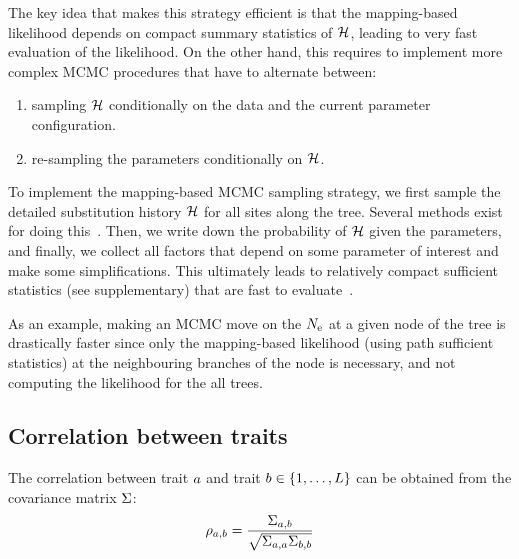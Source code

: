 \documentclass{MBE}
\begin{document}
	The key idea that makes this strategy efficient is that the mapping-based {likelihood} depends on compact summary statistics of $\mathcal{H}$, leading to very fast evaluation of the {likelihood}.
	On the other hand, this requires to implement more complex {MCMC} procedures that have to alternate between:
	\begin{enumerate}
		\item sampling $\mathcal{H}$ conditionally on the data and the current parameter configuration.
		\item re-sampling the parameters conditionally on $\mathcal{H}$.
	\end{enumerate}

	To implement the mapping-based {MCMC} sampling strategy, we first sample the detailed {substitution} history $\mathcal{H}$ for all sites along the tree.
	Several methods exist for doing this~\citep{Nielsen2002,Rodrigue2008}.
	Then, we write down the probability of $\mathcal{H}$ given the parameters, and finally, we collect all factors that depend on some parameter of interest and make some simplifications.
	This ultimately leads to relatively compact sufficient statistics (see supplementary) that are fast to evaluate~\citep{Irvahn2014,Davydov2016}.

	As an example, making an {MCMC} move on the $N_{\text{e}}$ at a given node of the tree is drastically faster since only the mapping-based {likelihood} (using path sufficient statistics) at the neighbouring branches of the node is necessary, and not computing the {likelihood} for the all trees.

	\subsection{Correlation between traits}
	\label{sec:Correlation}
	The correlation between trait $a$ and trait $b \in \{1, \hdots, L\}$ can be obtained from the covariance matrix $\Sigma$:
	\begin{equation}
		\rho_{a, b} = \dfrac{\Sigma_{a, b}}{\sqrt{\Sigma_{a, a} \Sigma_{b, b}}}
	\end{equation}
\end{document}

